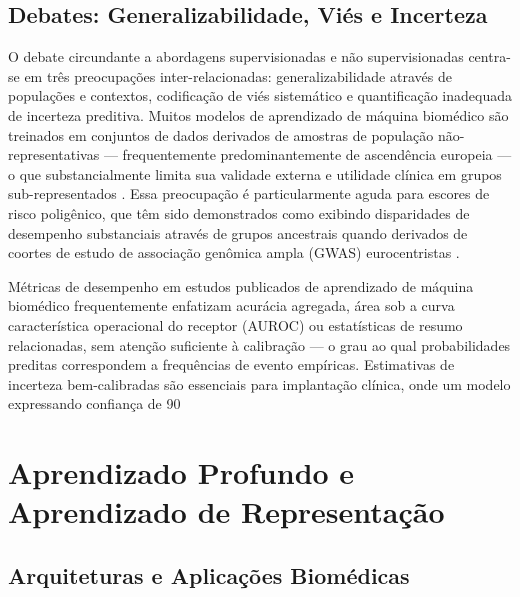 \subsection{Debates: Generalizabilidade, Viés e Incerteza}

O debate circundante a abordagens supervisionadas e não supervisionadas centra-se em três preocupações inter-relacionadas: generalizabilidade através de populações e contextos, codificação de viés sistemático e quantificação inadequada de incerteza preditiva. Muitos modelos de aprendizado de máquina biomédico são treinados em conjuntos de dados derivados de amostras de população não-representativas --- frequentemente predominantemente de ascendência europeia --- o que substancialmente limita sua validade externa e utilidade clínica em grupos sub-representados \parencite{popejoy2016, obermeyer2019}. Essa preocupação é particularmente aguda para escores de risco poligênico, que têm sido demonstrados como exibindo disparidades de desempenho substanciais através de grupos ancestrais quando derivados de coortes de estudo de associação genômica ampla (GWAS) eurocentristas \parencite{martin2019}.

Métricas de desempenho em estudos publicados de aprendizado de máquina biomédico frequentemente enfatizam acurácia agregada, área sob a curva característica operacional do receptor (AUROC) ou estatísticas de resumo relacionadas, sem atenção suficiente à calibração --- o grau ao qual probabilidades preditas correspondem a frequências de evento empíricas. Estimativas de incerteza bem-calibradas são essenciais para implantação clínica, onde um modelo expressando confiança de 90%

\section{Aprendizado Profundo e Aprendizado de Representação}

\subsection{Arquiteturas e Aplicações Biomédicas}

